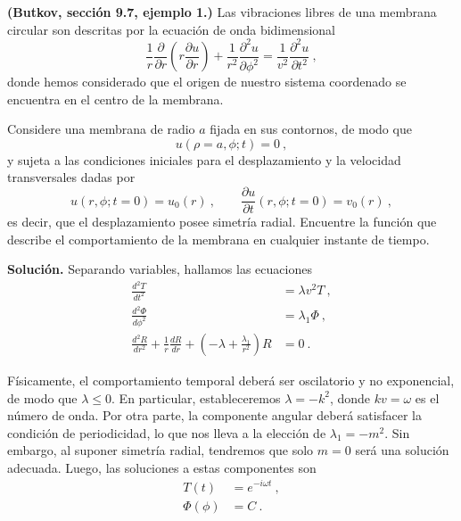 \begin{ejemplo}
    \textbf{(Butkov, sección 9.7, ejemplo 1.)} Las vibraciones libres de una membrana circular son descritas por la ecuación de onda bidimensional
    \begin{equation*}
        \frac{1}{r} \frac{\partial}{\partial r}\left( r \frac{\partial u}{\partial r} \right) + \frac{1}{r^2} \frac{\partial^2 u}{\partial \phi^2} = \frac{1}{v^2} \frac{\partial^2 u}{\partial t^2} \ ,
    \end{equation*}
    donde hemos considerado que el origen de nuestro sistema coordenado se encuentra en el centro de la membrana. \cite{Butkov}

    Considere una membrana de radio $a$ fijada en sus contornos, de modo que
    \begin{equation*}
        u(\rho=a, \phi; t) = 0 \ ,
    \end{equation*}
    y sujeta a las condiciones iniciales para el desplazamiento y la velocidad transversales dadas por
    \begin{equation*}
        u(r, \phi; t=0) = u_0(r) \ , \qquad \frac{\partial u}{\partial t}(r, \phi; t = 0) = v_0(r) \ ,
    \end{equation*}
    es decir, que el desplazamiento posee simetría radial. Encuentre la función que describe el comportamiento de la membrana en cualquier instante de tiempo.

    \textbf{Solución.} Separando variables, hallamos las ecuaciones
    \begin{align*}
        \frac{d^2 T}{dt^2} & = \lambda v^2 T \ , \\
        \frac{d^2 \Phi}{d\phi^2} & = \lambda_1 \Phi \ , \\
        \frac{d^2 R}{dr^2} + \frac{1}{r} \frac{dR}{dr} + \left(-\lambda + \frac{\lambda_1}{r^2}\right) R & = 0 \ .
    \end{align*}

    Físicamente, el comportamiento temporal deberá ser oscilatorio y no exponencial, de modo que $\lambda \leq 0$. En particular, estableceremos $\lambda = -k^2$, donde $k v = \omega$ es el número de onda. Por otra parte, la componente angular deberá satisfacer la condición de periodicidad, lo que nos lleva a la elección de $\lambda_1 = -m^2$. Sin embargo, al suponer simetría radial, tendremos que solo $m = 0$ será una solución adecuada. Luego, las soluciones a estas componentes son
    \begin{align*}
        T(t) & = e^{-i\omega t} \ , \\
        \Phi(\phi) & = C \ . 
    \end{align*} 
    

\end{ejemplo}
